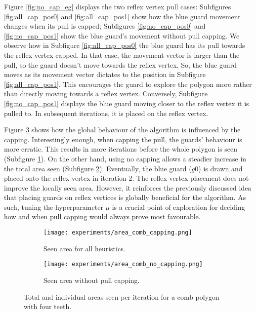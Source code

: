 Figure \ref{fig:no_cap_eg} displays the two reflex vertex pull cases: Subfigures \ref{fig:all_cap_pos0} and \ref{fig:all_cap_pos1} show how the blue guard movement changes when its pull is capped; Subfigures \ref{fig:no_cap_pos0} and \ref{fig:no_cap_pos1} show the blue guard's movement without pull capping. We  observe how in Subfigure \ref{fig:all_cap_pos0} the blue guard has its pull towards the reflex vertex capped. In that case, the movement vector is larger than the pull, so the guard doesn't move towards the reflex vertex. So, the blue guard moves as its movement vector dictates to the position in Subfigure \ref{fig:all_cap_pos1}. This encourages the guard to explore the polygon more rather than directly moving towards a reflex vertex.
Conversely, Subfigure \ref{fig:no_cap_pos1} displays the blue guard moving closer to the reflex vertex it is pulled to. In subsequent iterations, it is placed on the reflex vertex.


Figure \ref{fig:no_cap_plots} shows how the global behaviour of the algorithm is influenced by the capping. Interestingly enough, when capping the pull, the guards' behaviour is more erratic. This results in more iterations before the whole polygon is seen (Subfigure \ref{fig:area_all_cap}). On the other hand, using no capping allows a steadier increase in the total area seen (Subfigure \ref{fig:area_no_cap}). Eventually, the blue guard ($g0$) is drawn and placed onto the reflex vertex in iteration 2. The reflex vertex placement does not improve the locally seen area. However, it reinforces the previously discussed idea that placing guards on reflex vertices is globally beneficial for the algorithm. As such, tuning the hyperparameter $\mu$ is a crucial point of exploration for deciding how and when pull capping would always prove most favourable.

\begin{figure}[!h]
    \begin{subfigure}{0.45\textwidth}
        \texttt{[image: experiments/area\_comb\_capping.png]}
        \caption{Seen area for all heuristics.}
        \label{fig:area_all_cap}
    \end{subfigure}
    \hfill
    \begin{subfigure}{0.45\textwidth}
        \texttt{[image: experiments/area\_comb\_no\_capping.png]}
        \caption{Seen area without pull capping.}
        \label{fig:area_no_cap}
    \end{subfigure}
    \caption{Total and individual areas seen per iteration for a comb polygon with four teeth.}
    \label{fig:no_cap_plots}
\end{figure}

